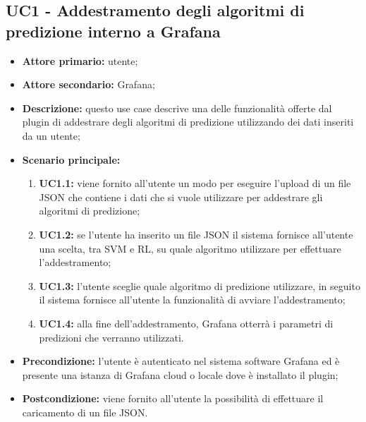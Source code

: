 \documentclass{article}
\begin{document}
	\subsection{UC1 - Addestramento degli algoritmi di predizione interno a Grafana}
	\begin{itemize}
		\item \textbf{Attore primario:} utente;
		\item \textbf{Attore secondario:} Grafana;
		\item \textbf{Descrizione:} questo use case descrive una delle funzionalità offerte dal plugin di addestrare degli algoritmi di predizione utilizzando dei dati inseriti da un utente;
		\item \textbf{Scenario principale:} 
			\begin{enumerate}
				\item \textbf{UC1.1:} viene fornito all'utente un modo per eseguire l'upload di un file JSON che contiene i dati che si vuole utilizzare per addestrare gli algoritmi di predizione;
				\item \textbf{UC1.2:} se l'utente ha inserito un file JSON il sistema fornisce all'utente una scelta, tra SVM e RL, su quale algoritmo utilizzare per effettuare l'addestramento;
				\item \textbf{UC1.3:} l'utente sceglie quale algoritmo di predizione utilizzare, in seguito il sistema fornisce all'utente la funzionalità di avviare l'addestramento;
				\item \textbf{UC1.4:} alla fine dell'addestramento, Grafana otterrà i parametri di predizioni che verranno utilizzati.
			\end{enumerate}
		\item \textbf{Precondizione:} l'utente è autenticato nel sistema software Grafana ed è presente una istanza di Grafana cloud o locale dove è installato il plugin;
		\item \textbf{Postcondizione:} viene fornito all'utente la possibilità di effettuare il caricamento di un file JSON.
	\end{itemize}
\end{document}
